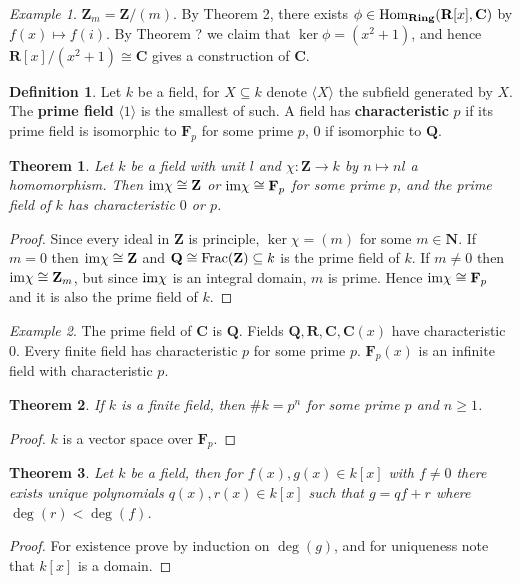 \documentclass[11pt]{article}
\theoremstyle{definition}
\newtheorem*{defin}{Definition}
\theoremstyle{plain}
\newtheorem{theorem}{Theorem}
\theoremstyle{remark}
\newtheorem*{example}{Example}
\newcommand{\R}{\mathbf{R}}
\newcommand{\Z}{\mathbf{Z}}
\newcommand{\Frac}{\textup{Frac}}
\newcommand{\N}{\mathbf{N}}
\newcommand{\C}{\mathbf{C}}
\newcommand{\F}{\mathbf{F}}
\newcommand{\Hom}{\textup{Hom}}
\newcommand{\im}{\textup{im}}
\newcommand{\Q}{\mathbf{Q}}
\newcommand{\Ring}{\mathbf{Ring}}
\begin{document}
\begin{example}
$\Z_m=\Z/(m)$. By Theorem 2, there exists $\phi\in\Hom_{\Ring}(\R[x],\C)$ by $f(x)\mapsto f(i)$. By Theorem ? we claim that $\ker\phi=(x^2+1)$, and hence $\R[x]/(x^2+1)\cong\C$ gives a construction of $\C$.
\end{example}

\begin{defin}
Let $k$ be a field, for $X\subseteq k$ denote $\langle X\rangle$ the subfield generated by $X$. The \textbf{prime field} $\langle1\rangle$ is the smallest of such. A field has \textbf{characteristic} $p$ if its prime field is isomorphic to $\F_p$ for some prime $p$, $0$ if isomorphic to $\Q$.
\end{defin}

\begin{theorem}
Let $k$ be a field with unit $l$ and $\chi:\Z\to k$ by $n\mapsto nl$ a homomorphism. Then $\im\chi\cong\Z$ or $\im\chi\cong\F_p$ for some prime $p$, and the prime field of $k$ has characteristic $0$ or $p$.
\end{theorem}
\begin{proof}
Since every ideal in $\Z$ is principle, $\ker\chi=(m)$ for some $m\in\N$. If $m=0$ then $\im\chi\cong\Z$ and $\Q\cong\Frac(\Z)\subseteq k$ is the prime field of $k$. If $m\neq0$ then $\im\chi\cong\Z_m$, but since $\im\chi$ is an integral domain, $m$ is prime. Hence $\im\chi\cong\F_p$ and it is also the prime field of $k$.
\end{proof}

\begin{example}
The prime field of $\C$ is $\Q$. Fields $\Q,\R,\C,\C(x)$ have characteristic $0$. Every finite field has characteristic $p$ for some prime $p$. $\F_p(x)$ is an infinite field with characteristic $p$.
\end{example}

\begin{theorem}
If $k$ is a finite field, then $\#k=p^n$ for some prime $p$ and $n\geq1$.
\end{theorem}
\begin{proof}
$k$ is a vector space over $\F_p$.
\end{proof}

\begin{theorem}
Let $k$ be a field, then for $f(x),g(x)\in k[x]$ with $f\neq0$ there exists unique polynomials $q(x),r(x)\in k[x]$ such that $g=qf+r$ where $\deg(r)<\deg(f)$.
\end{theorem}
\begin{proof}
For existence prove by induction on $\deg(g)$, and for uniqueness note that $k[x]$ is a domain.
\end{proof}
\end{document}
